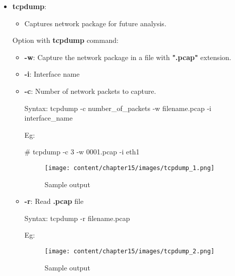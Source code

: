 \begin{flushleft}
\begin{itemize}
\begin{itemize}
	\end{itemize}
	\newpage
	\item \textbf{tcpdump}: 
	\begin{itemize}
		\item Captures network package for future analysis.
	\end{itemize}
	\bigskip
	Option with \textbf{tcpdump} command:
	\begin{itemize}
		\item \textbf{-w}: Capture the network package in a file with \textbf{".pcap"} extension.
		\item \textbf{-i}: Interface name
		\item \textbf{-c}: Number of network packets to capture.
		\begin{tcolorbox}[breakable,notitle,boxrule=0pt,colback=pink,colframe=pink]
			\color{black}
			\font=9pt
			Syntax: tcpdump -c number\_of\_packets -w filename.pcap  -i interface\_name
			\font=4pt
		\end{tcolorbox}
		Eg:
		\begin{tcolorbox}[breakable,notitle,boxrule=-0pt,colback=black,colframe=black]
			\color{green}
			\font=9pt
			\# tcpdump -c 3 -w 0001.pcap -i eth1
			\font=4pt
		\end{tcolorbox}
		\begin{figure}[h!]
			\centering
			\texttt{[image: content/chapter15/images/tcpdump\_1.png]}
			\caption{Sample output}
			\label{fig:output7}
		\end{figure}
	
		\item \textbf{-r}: Read \textbf{.pcap} file
		\begin{tcolorbox}[breakable,notitle,boxrule=0pt,colback=pink,colframe=pink]
			\color{black}
			\font=9pt
			Syntax: tcpdump -r filename.pcap
			\font=4pt
		\end{tcolorbox}
		Eg:
		\begin{figure}[h!]
			\centering
			\texttt{[image: content/chapter15/images/tcpdump\_2.png]}
			\caption{Sample output}
			\label{fig:output8}
		\end{figure}
		

\end{itemize}
\end{itemize}
\end{flushleft}
